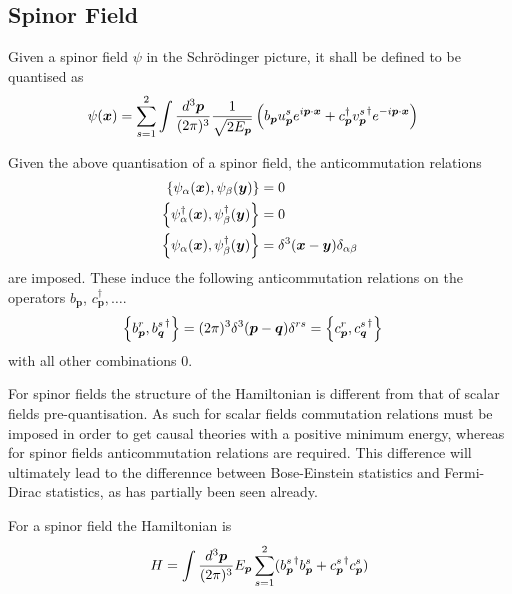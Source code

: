\documentclass{article}
\begin{document}
\subsection{Spinor Field}

\begin{definition}
Given a spinor field $\psi$ in the Schr\"odinger picture, it shall be defined to be quantised as
\begin{align*}
\psi(\bm{x}) &= \sum_{s=1}^2 \int\tmeas  \frac{1}{\sqrt{2E_{\bm{p}}}} \left( b_{\bm{p}}u_{\bm{p}}^s e^{i\bm{p}\cdot\bm{x}} + c_{\bm{p}}^\dagger {v_{\bm{p}}^s}^\dagger e^{-i\bm{p}\cdot\bm{x}} \right) 
\end{align*}
\end{definition}

\begin{theorem}
Given the above quantisation of a spinor field, the anticommutation relations 
\begin{align*}
    \acomm[\psi_\alpha(\bm{x})]{\psi_\beta(\bm{y})} &= 0 \\
    \acomm[\psi_\alpha^\dagger(\bm{x})]{\psi_\beta^\dagger(\bm{y})} &= 0 \\
    \acomm[\psi_\alpha(\bm{x})]{\psi_\beta^\dagger(\bm{y})} &= \delta^3(\bm{x}-\bm{y})\delta_{\alpha\beta} 
\end{align*}
are imposed. These induce the following anticommutation relations on the operators $b_{\bm{p}}$, $c_{\bm{p}}^\dagger, \dots$. 
\begin{align*}
    \acomm[b_{\bm{p}}^r]{{b_{\bm{q}}^s}^\dagger} &= (2\pi)^3 \delta^3(\bm{p}-\bm{q}) \delta^{rs} = \acomm[c_{\bm{p}}^r]{{c_{\bm{q}}^s}^\dagger}
\end{align*}
with all other combinations $0$. 
\end{theorem}

\begin{idea}
For spinor fields the structure of the Hamiltonian is different from that of scalar fields pre-quantisation. As such for scalar fields commutation relations must be imposed in order to get causal theories with a positive minimum energy, whereas for spinor fields anticommutation relations are required. This difference will ultimately lead to the differennce between Bose-Einstein statistics and Fermi-Dirac statistics, as has partially been seen already. 
\end{idea}

\begin{theorem}
For a spinor field the Hamiltonian is 
\[
H=\int \tmeas E_{\bm{p}} \sum_{s=1}^2 ({b_{\bm{p}}^s}^\dagger b_{\bm{p}}^s + {c_{\bm{p}}^s}^\dagger c_{\bm{p}}^s )
\]
\end{theorem}
\end{document}

